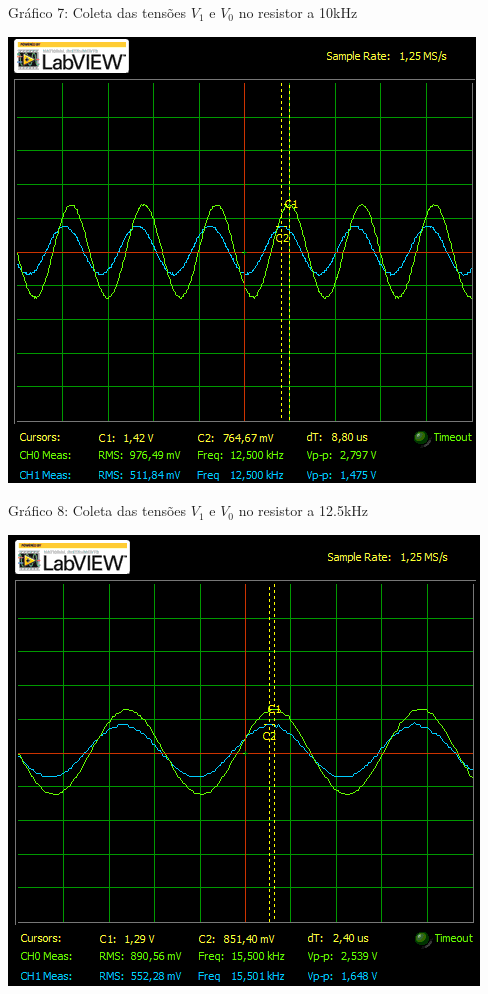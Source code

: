 \documentclass[a4 paper]{article}
\begin{document}
\begin{center}
Gráfico 7: Coleta das tensões $V_1$ e $V_0$ no resistor a 10kHz
\end{center}

\begin{table}[h]
\centering
\includegraphics[scale=0.7]{graficos/circ2/rgadicoa2-2-12_5}
\end{table}

\begin{center}
Gráfico 8: Coleta das tensões $V_1$ e $V_0$ no resistor a 12.5kHz
\end{center}

\newpage
\begin{table}[h]
\centering
\includegraphics[scale=0.7]{graficos/circ2/rgadicoa2-2-15_5}
\end{table}
\end{document}
